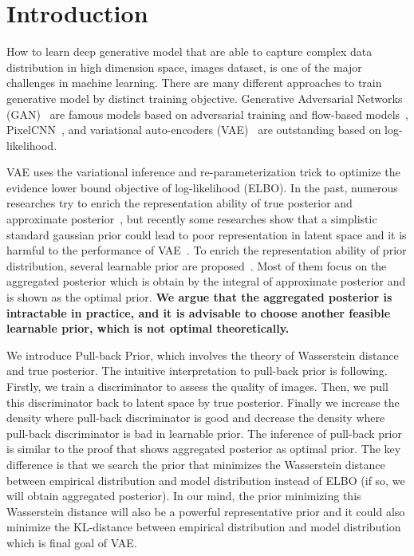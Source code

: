\section{Introduction}

How to learn deep generative model that are able to capture complex data distribution in high dimension space, \IE images dataset, is one of the major challenges in machine learning. There are many different approaches to train generative model by distinct training objective. Generative Adversarial Networks (GAN)~\cite{goodfellow2014generative} are famous models based on adversarial training and flow-based models~\cite{dinh2016density,kingma2018glow}, PixelCNN~\cite{van2016conditional}, and variational auto-encoders (VAE)~\cite{kingma2014auto,rezende_stochastic_2014} are outstanding based on log-likelihood. 

VAE uses the variational inference and re-parameterization trick to optimize the evidence lower bound objective of log-likelihood (ELBO). In the past, numerous researches try to enrich the representation ability of true posterior and approximate posterior~\cite{kingma2016improved,tomczak2016improving}, but recently some researches show that a simplistic standard gaussian prior could lead to poor representation in latent space and it is harmful to the performance of VAE~\cite{tomczak2018vae}. To enrich the representation ability of prior distribution, several learnable prior are proposed~\cite{tomczak2018vae,bauer2019resampled,takahashi2019variational}. Most of them focus on the aggregated posterior which is obtain by the integral of approximate posterior and is shown as the optimal prior. \textbf{We argue that the aggregated posterior is intractable in practice, and it is advisable to choose another feasible learnable prior, which is not optimal theoretically. } 

We introduce Pull-back Prior, which involves the theory of Wasserstein distance~\cite{arjovsky2017wasserstein} and true posterior. The intuitive interpretation to pull-back prior is following. Firstly, we train a discriminator to assess the quality of images. Then, we pull this discriminator back to latent space by true posterior. Finally we increase the density where pull-back discriminator is good and decrease the density where pull-back discriminator is bad in learnable prior. The inference of pull-back prior is similar to the proof that shows aggregated posterior as optimal prior. The key difference is that we search the prior that minimizes the Wasserstein distance between empirical distribution and model distribution instead of ELBO (if so, we will obtain aggregated posterior). In our mind, the prior minimizing this Wasserstein distance will also be a powerful representative prior and it could also minimize the KL-distance between empirical distribution and model distribution which is final goal of VAE. 

